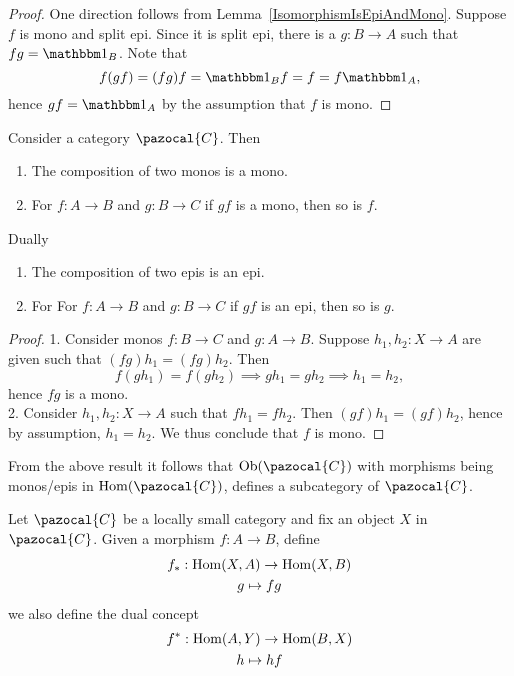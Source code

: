 \begin{proof}
    One direction follows from Lemma~\ref{IsomorphismIsEpiAndMono}. Suppose $f$ is mono and split epi. Since it is split epi, there is a $g:B\rightarrow A$ such that $fg = \fone_B$. Note that 
    $$f(gf)=(fg)f=\fone_B f= f = f\fone_A,$$
    hence $gf = \fone_A$ by the assumption that $f$ is mono.
\end{proof}
\begin{lemma}
    Consider a category $\pazocal{C}$. Then 
    \begin{enumerate}
        \item The composition of two monos is a mono.
        \item For $f:A\rightarrow B$ and $g : B\rightarrow C$ if $gf$ is a mono, then so is $f$. 
    \end{enumerate}
    Dually 
    \begin{enumerate}
        \item The composition of two epis is an epi.
        \item For For $f:A\rightarrow B$ and $g : B\rightarrow C$ if $gf$ is an epi, then so is $g$.
    \end{enumerate}
\end{lemma}
\begin{proof}
    1. Consider monos $f: B\rightarrow C$ and $g:A\rightarrow B$. Suppose $h_1,h_2 : X\rightarrow A$ are given such that $(fg)h_1 = (fg)h_2$. Then 
    $$f(gh_1)=f(gh_2)\implies gh_1 = gh_2 \implies h_1 =h_2,$$
    hence $fg$ is a mono.\\
    2. Consider $h_1,h_2 : X \rightarrow A$ such that $fh_1 = fh_2$. Then $(gf)h_1 = (gf)h_2$, hence by assumption, $h_1 = h_2$. We thus conclude that $f$ is mono.
\end{proof}
\begin{remark}
    From the above result it follows that $\Ob(\pazocal{C})$ with morphisms being monos/epis in $\Hom(\pazocal{C})$, defines a subcategory of $\pazocal{C}$.
\end{remark}
\begin{definition}
    Let $\pazocal{C}$ be a locally small category and fix an object $X$ in $\pazocal{C}$. Given a morphism $f:A\rightarrow B$, define 
    \begin{gather*}
        f_\ast : \mathrm{Hom}(X,A) \rightarrow \mathrm{Hom}(X,B)\\
        g\mapsto fg
    \end{gather*}  
    we also define the dual concept 
    \begin{gather*}
        f^\ast : \mathrm{Hom}(A,Y) \rightarrow \mathrm{Hom}(B,X)\\
        h\mapsto hf
    \end{gather*}
\end{definition}
